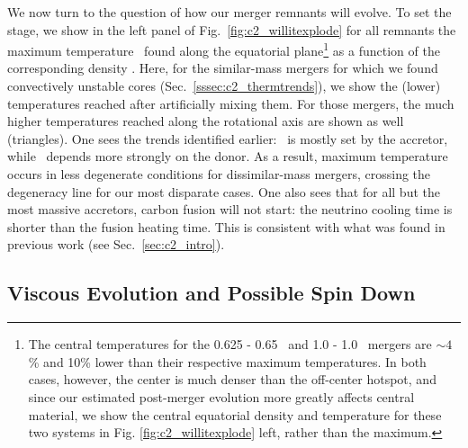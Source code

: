 We now turn to the question of how our merger remnants will evolve.  To set the stage, we show in the left panel of Fig.~\ref{fig:c2_willitexplode} for all remnants the maximum temperature \Tmax\ found along the equatorial plane\footnote{The central temperatures for the 0.625 - 0.65 \Msun\ and 1.0 - 1.0 \Msun\ mergers are $\sim\!4$\% and 10\% lower than their respective maximum temperatures.  In both cases, however, the center is much denser than the off-center hotspot, and since our estimated post-merger evolution more greatly affects central material, we show the central equatorial density and temperature for these two systems in Fig. \ref{fig:c2_willitexplode} left, rather than the maximum.} as a function of the corresponding density \rhoTmax.  Here, for the similar-mass mergers for which we found convectively unstable cores (Sec.~\ref{sssec:c2_thermtrends}), we show the (lower) temperatures reached after artificially mixing them.   For those mergers, the much higher temperatures reached along the rotational axis are shown as well (triangles).  One sees the trends identified earlier: \Tmax\ is mostly set by the accretor, while \rhoTmax\ depends more strongly on the donor.  As a result, maximum temperature occurs in less degenerate conditions for dissimilar-mass mergers, crossing the degeneracy line for our most disparate cases.  One also sees that for all but the most massive accretors, carbon fusion will not start: the neutrino cooling time is shorter than the fusion heating time.  This is consistent with what was found in previous work (see Sec.~\ref{sec:c2_intro}).

\subsection{Viscous Evolution and Possible Spin Down}
\label{ssec:ch2_viscevo_possiblespindown}

